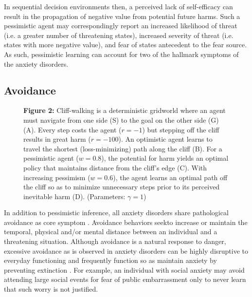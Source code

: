 \documentclass[11pt]{article} %
\begin{document}
In sequential decision environments then, a perceived lack of self-efficacy can
result in the propagation of negative value from potential future harms. Such a
pessimistic agent may correspondingly report an increased likelihood of threat
(i.e. a greater number of threatening states), increased severity of threat (i.e.
states with more negative value), and fear of states antecedent to the fear source.
As such, pessimistic learning can account for two of the hallmark symptoms of
the anxiety disorders.

\subsection{Avoidance}

\begin{figure}
  \centerline{%
  }
  \par \textbf{Figure 2:} Cliff-walking is a deterministic gridworld where an agent
  must navigate from one side (S) to the goal on the other side (G) (A). Every
  step costs the agent ($r=-1$) but stepping off the cliff results in great harm ($r=-100$).
  An optimistic agent learns to travel the shortest (loss-minimizing) path along the cliff (B).
  For a pessimistic agent ($w=0.8$), the potential for harm yields an optimal policy that
  maintains distance from the cliff's edge (C). With increasing pessimism ($w=0.6$), the agent
  learns an optimal path off the cliff so as to minimize unnecessary steps prior to its
  perceived inevitable harm (D). (Parameters: $\gamma = 1$)
\end{figure}

In addition to pessimistic inference, all anxiety disorders share pathological
avoidance as core symptom \citep{dsm5, Krypotos2015, Arnaudova2017}. Avoidance
behaviors seekto increase or maintain the temporal, physical and/or mental distance
between an individual and a threatening situation. Although avoidance is a natural response to danger, excessive avoidance as is observed in anxiety disorders can be highly disruptive to everyday
functioning \cite{Salter2004} and frequently function so as maintain anxiety
by preventing extinction \citep{Arnaudova2017}. For example, an individual with social anxiety may avoid
attending large social events for fear of public embarrassment only to never learn
that such worry is not justified.
\end{document}
